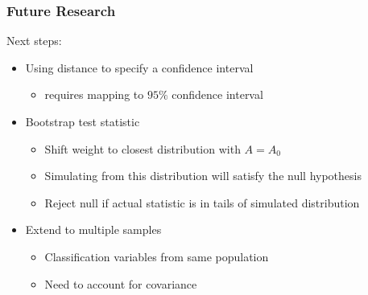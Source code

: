 \documentclass{beamer}
\begin{document}
\begin{frame}
\frametitle{Future Research}

Next steps:
\begin{itemize}
    \item Using distance to specify a confidence interval
    \begin{itemize}
        \item requires mapping to $95\%$ confidence interval
    \end{itemize}
    \item Bootstrap test statistic
    \begin{itemize}
        \item Shift weight to closest distribution with $A = A_0$
        \item Simulating from this distribution will satisfy the null hypothesis
        \item Reject null if actual statistic is in tails of simulated distribution
    \end{itemize}
    \item Extend to multiple samples
    \begin{itemize}
        \item Classification variables from same population
        \item Need to account for covariance
    \end{itemize}
\end{itemize}

\end{frame}




\end{document}
